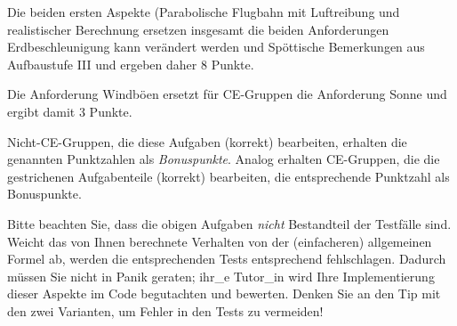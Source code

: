 Die beiden ersten Aspekte (\glqq{}Parabolische Flugbahn mit Luftreibung und realistischer Berechnung\grqq{} ersetzen insgesamt die
beiden Anforderungen \glqq{}Erdbeschleunigung kann ver\"andert werden\grqq{} und \glqq{}Sp\"ottische Bemerkungen\grqq{} aus Aufbaustufe III und ergeben
daher 8 Punkte. 

Die Anforderung \glqq{}Windb\"oen\grqq{} ersetzt f\"ur CE-Gruppen die Anforderung \glqq{}Sonne\grqq{} und ergibt damit 3 Punkte.

\glqq{}Nicht-CE-Gruppen\grqq{}, die diese Aufgaben (korrekt) bearbeiten, erhalten die genannten Punktzahlen als \emph{Bonuspunkte}. Analog
erhalten CE-Gruppen, die die \glqq{}gestrichenen\grqq{} Aufgabenteile (korrekt) bearbeiten, die entsprechende Punktzahl als Bonuspunkte.

Bitte beachten Sie, dass die obigen Aufgaben \emph{nicht} Bestandteil der Testf\"alle sind. Weicht das von Ihnen berechnete Verhalten von der (einfacheren)
allgemeinen Formel ab, werden die entsprechenden Tests entsprechend fehlschlagen. Dadurch m\"ussen Sie nicht in Panik geraten; ihr\_e Tutor\_in wird Ihre
Implementierung dieser Aspekte im Code begutachten und bewerten. Denken Sie an den Tip mit den \glqq{}zwei Varianten\grqq{}, um Fehler in den Tests zu vermeiden!
